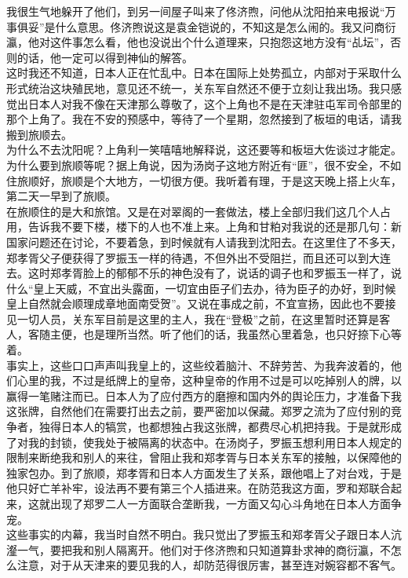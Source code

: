 我很生气地躲开了他们，到另一间屋子叫来了佟济煦，问他从沈阳拍来电报说“万事俱妥”是什么意思。佟济煦说这是袁金铠说的，不知这是怎么闹的。我又问商衍瀛，他对这件事怎么看，他也没说出个什么道理来，只抱怨这地方没有“乩坛”，否则的话，他一定可以得到神仙的解答。\\

这时我还不知道，日本人正在忙乱中。日本在国际上处势孤立，内部对于采取什么形式统治这块殖民地，意见还不统一，关东军自然还不便于立刻让我出场。我只感觉出日本人对我不像在天津那么尊敬了，这个上角也不是在天津驻屯军司令部里的那个上角了。我在不安的预感中，等待了一个星期，忽然接到了板垣的电话，请我搬到旅顺去。\\

为什么不去沈阳呢？上角利一笑嘻嘻地解释说，这还要等和板垣大佐谈过才能定。为什么要到旅顺等呢？据上角说，因为汤岗子这地方附近有“匪”，很不安全，不如住旅顺好，旅顺是个大地方，一切很方便。我听着有理，于是这天晚上搭上火车，第二天一早到了旅顺。\\

在旅顺住的是大和旅馆。又是在对翠阁的一套做法，楼上全部归我们这几个人占用，告诉我不要下楼，楼下的人也不准上来。上角和甘粕对我说的还是那几句：新国家问题还在讨论，不要着急，到时候就有人请我到沈阳去。在这里住了不多天，郑孝胥父子便获得了罗振玉一样的待遇，不但外出不受阻拦，而且还可以到大连去。这时郑孝胥脸上的郁郁不乐的神色没有了，说话的调子也和罗振玉一样了，说什么“皇上天威，不宜出头露面，一切宜由臣子们去办，待为臣子的办好，到时候皇上自然就会顺理成章地面南受贺”。又说在事成之前，不宜宣扬，因此也不要接见一切人员，关东军目前是这里的主人，我在“登极”之前，在这里暂时还算是客人，客随主便，也是理所当然。听了他们的话，我虽然心里着急，也只好捺下心等着。\\

事实上，这些口口声声叫我皇上的，这些绞着脑汁、不辞劳苦、为我奔波着的，他们心里的我，不过是纸牌上的皇帝，这种皇帝的作用不过是可以吃掉别人的牌，以赢得一笔赌注而已。日本人为了应付西方的磨擦和国内外的舆论压力，才准备下我这张牌，自然他们在需要打出去之前，要严密加以保藏。郑罗之流为了应付别的竞争者，独得日本人的犒赏，也都想独占我这张牌，都费尽心机把持我。于是就形成了对我的封锁，使我处于被隔离的状态中。在汤岗子，罗振玉想利用日本人规定的限制来断绝我和别人的来往，曾阻止我和郑孝胥与日本关东军的接触，以保障他的独家包办。到了旅顺，郑孝胥和日本人方面发生了关系，跟他唱上了对台戏，于是他只好亡羊补牢，设法再不要有第三个人插进来。在防范我这方面，罗和郑联合起来，这就出现了郑罗二人一方面联合垄断我，一方面又勾心斗角地在日本人方面争宠。\\

这些事实的内幕，我当时自然不明白。我只觉出了罗振玉和郑孝胥父子跟日本人沆瀣一气，要把我和别人隔离开。他们对于佟济煦和只知道算卦求神的商衍瀛，不怎么注意，对于从天津来的要见我的人，却防范得很厉害，甚至连对婉容都不客气。\\

